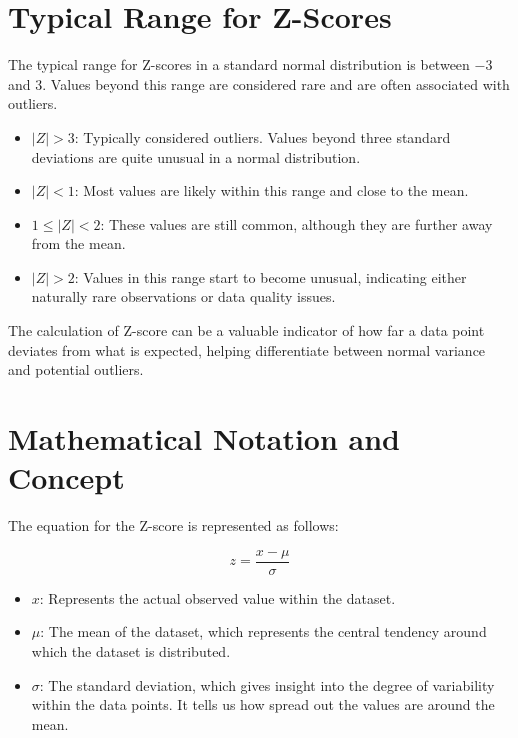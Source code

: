 \documentclass[
  12 pt,
  a4paper,
]{book}
\providecommand{\tightlist}{%
  \setlength{\itemsep}{0pt}\setlength{\parskip}{0pt}}
\numberwithin{equation}{section}
\theoremstyle{plain}      %
\theoremstyle{definition} %
\theoremstyle{remark}     %
\theoremstyle{note}         %
\begin{document}
\hypertarget{typical-range-for-z-scores}{%
\section{Typical Range for Z-Scores}\label{typical-range-for-z-scores}}

The typical range for Z-scores in a standard normal distribution is
between \(-3\) and \(3\). Values beyond this range are considered rare
and are often associated with outliers.

\begin{itemize}
\tightlist
\item
  \textbf{\(|Z| > 3\)}: Typically considered outliers. Values beyond
  three standard deviations are quite unusual in a normal distribution.
\item
  \(|Z| < 1\): Most values are likely within this range and close to the
  mean.
\item
  \(1 \leq |Z| < 2\): These values are still common, although they are
  further away from the mean.
\item
  \(|Z| > 2\): Values in this range start to become unusual, indicating
  either naturally rare observations or data quality issues.
\end{itemize}

The calculation of Z-score can be a valuable indicator of how far a data
point deviates from what is expected, helping differentiate between
normal variance and potential outliers.

\hypertarget{mathematical-notation-and-concept}{%
\section{Mathematical Notation and
Concept}\label{mathematical-notation-and-concept}}

The equation for the Z-score is represented as follows:

\[
z = \frac{x - \mu}{\sigma}
\]

\begin{itemize}
\tightlist
\item
  \textbf{\(x\)}: Represents the actual observed value within the
  dataset.
\item
  \textbf{\(\mu\)}: The mean of the dataset, which represents the
  central tendency around which the dataset is distributed.
\item
  \textbf{\(\sigma\)}: The standard deviation, which gives insight into
  the degree of variability within the data points. It tells us how
  spread out the values are around the mean.
\end{itemize}
\end{document}
